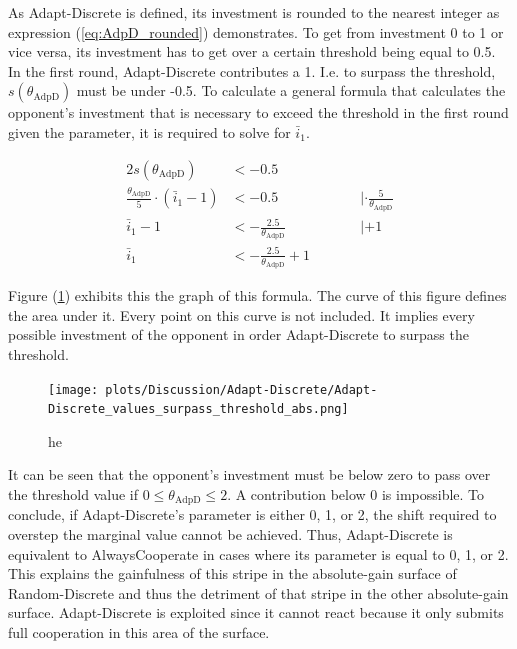 \documentclass{article}
\begin{document}
	As Adapt-Discrete is defined, its investment is rounded to the nearest integer as expression (\ref{eq:AdpD_rounded}) demonstrates.
	To get from investment 0 to 1 or vice versa, its investment has to get over a certain threshold being equal to 0.5.
	In the first round, Adapt-Discrete contributes a 1.
	I.e. to surpass the threshold, $s(\theta_{\mathrm{AdpD}})$ must be under -0.5.
	To calculate a general formula that calculates the opponent's investment that is necessary to exceed the threshold in the first round given the parameter, it is required to solve for $\bar i_1$.

	\begin{alignat*}{2}
		s(\theta_{\mathrm{AdpD}}) &< -0.5 &&\\
		\frac{\theta_{\mathrm{AdpD}}}{5} \cdot (\bar i_1 - 1) &< -0.5 &&\qquad | \cdot \frac{5}{\theta_{\mathrm{AdpD}}} \\
		\bar i_1 - 1 &< -\frac{2.5}{\theta_{\mathrm{AdpD}}} &&\qquad | + 1 \\
		\bar i_1 &< -\frac{2.5}{\theta_{\mathrm{AdpD}}} + 1 &&
	\end{alignat*}

	Figure (\ref{fig:surpass_theshold_abs}) exhibits this the graph of this formula.
	The curve of this figure defines the area under it.
	Every point on this curve is not included.
	It implies every possible investment of the opponent in order Adapt-Discrete to surpass the threshold.
	\begin{figure}[h]
		\begin{center}
			\texttt{[image: plots/Discussion/Adapt-Discrete/Adapt-Discrete\_values\_surpass\_threshold\_abs.png]}
		\end{center}
		\caption{he}
		\label{fig:surpass_theshold_abs}
	\end{figure}

	It can be seen that the opponent's investment must be below zero to pass over the threshold value if $0 \le \theta_{\mathrm{AdpD}} \le 2$.
	A contribution below 0 is impossible.
	To conclude, if Adapt-Discrete's parameter is either 0, 1, or 2, the shift required to overstep the marginal value cannot be achieved.
	Thus, Adapt-Discrete is equivalent to AlwaysCooperate in cases where its parameter is equal to 0, 1, or 2.\\
	This explains the gainfulness of this stripe in the absolute-gain surface of Random-Discrete and thus the detriment of that stripe in the other absolute-gain surface.
	Adapt-Discrete is exploited since it cannot react because it only submits full cooperation in this area of the surface.\\
\end{document}

